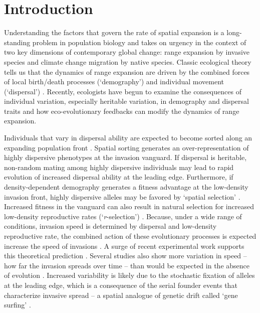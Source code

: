 \documentclass[11pt]{article}
\begin{document}
\newpage{}

\section*{Introduction}
Understanding the factors that govern the rate of spatial expansion is a long-standing problem in population biology and takes on urgency in the context of two key dimensions of contemporary global change: range expansion by invasive species and climate change migration by native species.
Classic ecological theory tells us that the dynamics of range expansion are driven by the combined forces of local birth/death processes (`demography') and individual movement (`dispersal') \citep{skellam_random_1951,okubo_diffusion_1980,kot_discrete-time_1986,kot_dispersal_1996}.
Recently, ecologists have begun to examine the consequences of individual variation, especially heritable variation, in demography and dispersal traits and how eco-evolutionary feedbacks can modify the dynamics of range expansion.

Individuals that vary in dispersal ability are expected to become sorted along an expanding population front \citep{shine_evolutionary_2011}.
Spatial sorting generates an over-representation of highly dispersive phenotypes at the invasion vanguard.
If dispersal is heritable, non-random mating among highly dispersive individuals may lead to rapid evolution of increased dispersal ability at the leading edge.
Furthermore, if density-dependent demography generates a fitness advantage at the low-density invasion front, highly dispersive alleles may be favored by `spatial selection' \citep{phillips_life-history_2010, perkins_evolution_2013}.
Increased fitness in the vanguard can also result in natural selection for increased low-density reproductive rates (`\textit{r}-selection’) \citep{phillips_life-history_2010}.
Because, under a wide range of conditions, invasion speed is determined by dispersal and low-density reproductive rate, the combined action of these evolutionary processes is expected increase the speed of invasions \citep{phillips_evolutionary_2015}. A surge of recent experimental work supports this theoretical prediction \citep{williams_rapid_2016, ochocki_rapid_2017, weiss-lehman_rapid_2017,van2018kin}.
Several studies also show more variation in speed -- how far the invasion spreads over time -- than would be expected in the absence of evolution \citep{phillips_evolutionary_2015, ochocki_rapid_2017, weiss-lehman_rapid_2017}.
Increased variability is likely due to the stochastic fixation of alleles at the leading edge, which is a consequence of the serial founder events that characterize invasive spread -- a spatial analogue of genetic drift called `gene surfing' \citep{edmonds_mutations_2004,klopfstein_fate_2006,excoffier_surfing_2008,peischl_expansion_2015,phillips_evolutionary_2015, ochocki_rapid_2017, weiss-lehman_rapid_2017}.
\end{document}

